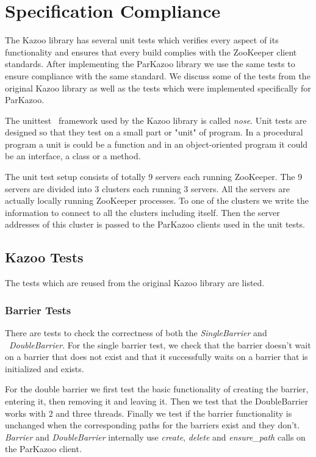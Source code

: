\chapter{Specification Compliance}

The Kazoo library has several unit tests which verifies every aspect of its functionality and ensures that every build complies with the ZooKeeper client standards. After implementing the ParKazoo library we use the same tests to ensure compliance with the same standard. We discuss some of the tests from the original Kazoo library as well as the tests which were implemented specifically for ParKazoo.

The unittest~\cite{hamill2004unit} framework used by the Kazoo library is called \textit{nose}. Unit tests are designed so that they test on a small part or "unit" of program. In a procedural program a unit is could be a function and in an object-oriented program it could be an interface, a class or a method.

The unit test setup consists of totally 9 servers each running ZooKeeper. The 9 servers are divided into 3 clusters each running 3 servers. All the servers are actually locally running ZooKeeper processes. To one of the clusters we write the information to connect to all the clusters including itself. Then the server addresses of this cluster is passed to the ParKazoo clients used in the unit tests. 

\section{Kazoo Tests}
The tests which are reused from the original Kazoo library are listed.

	\subsection{Barrier Tests}
	There are tests to check the correctness of both the \textit{SingleBarrier} and ~\textit{DoubleBarrier}. For the single barrier test, we check that the barrier doesn't wait on a barrier that does not exist and that it successfully waits on a barrier that is initialized and exists.
	
	For the double barrier we first test the basic functionality of creating the barrier, entering it, then removing it and leaving it. Then we test that the DoubleBarrier works with 2 and three threads. Finally we test if the barrier functionality is unchanged when the corresponding paths for the barriers exist and they don't. \textit{Barrier} and \textit{DoubleBarrier} internally use \textit{create}, \textit{delete} and \textit{ensure\_path} calls on the ParKazoo client.
	
